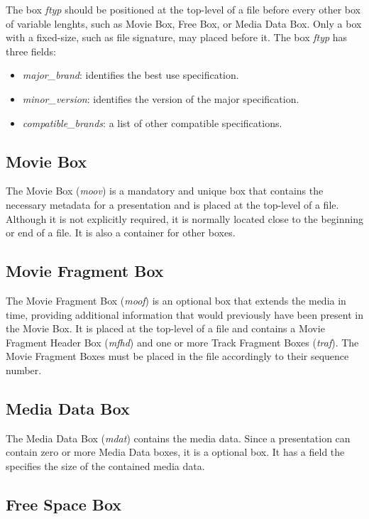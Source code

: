 The box \emph{ftyp} should be positioned at the top-level of a file before every other box of variable lenghts, such as Movie Box, Free Box, or Media Data Box. Only a box with a fixed-size, such as file signature, may placed before it. The box \emph{ftyp} has three fields:

\begin{itemize}
\item \emph{major\_brand}: identifies the best use specification.
\item \emph{minor\_version}: identifies the version of the major specification.
\item \emph{compatible\_brands}: a list of other compatible specifications.
\end{itemize}

\subsection*{Movie Box}

The Movie Box (\emph{moov}) is a mandatory and unique box that contains the necessary metadata for a presentation and is placed at the top-level of a file. Although it is not explicitly required, it is normally located close to the beginning or end of a file. It is also a container for other boxes.

\subsection*{Movie Fragment Box}

The Movie Fragment Box (\emph{moof}) is an optional box that extends the media in time, providing additional information that would previously have been present in the Movie Box. It is placed at the top-level of a file and contains a Movie Fragment Header Box (\emph{mfhd}) and one or more Track Fragment Boxes (\emph{traf}). The Movie Fragment Boxes must be placed in the file accordingly to their sequence number.

\subsection*{Media Data Box}

The Media Data Box (\emph{mdat}) contains the media data. Since a presentation can contain zero or more Media Data boxes, it is a optional box. It has a field the specifies the size of the contained media data.

\subsection*{Free Space Box}

